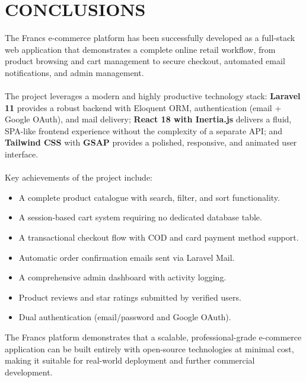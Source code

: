 \chapter{CONCLUSIONS}

The Francs e-commerce platform has been successfully developed as a full-stack web application that demonstrates a complete online retail workflow, from product browsing and cart management to secure checkout, automated email notifications, and admin management.
\\\\
The project leverages a modern and highly productive technology stack: \textbf{Laravel 11} provides a robust backend with Eloquent ORM, authentication (email + Google OAuth), and mail delivery; \textbf{React 18 with Inertia.js} delivers a fluid, SPA-like frontend experience without the complexity of a separate API; and \textbf{Tailwind CSS} with \textbf{GSAP} provides a polished, responsive, and animated user interface.
\\\\
Key achievements of the project include:
\begin{itemize}
    \item A complete product catalogue with search, filter, and sort functionality.
    \item A session-based cart system requiring no dedicated database table.
    \item A transactional checkout flow with COD and card payment method support.
    \item Automatic order confirmation emails sent via Laravel Mail.
    \item A comprehensive admin dashboard with activity logging.
    \item Product reviews and star ratings submitted by verified users.
    \item Dual authentication (email/password and Google OAuth).
\end{itemize}
The Francs platform demonstrates that a scalable, professional-grade e-commerce application can be built entirely with open-source technologies at minimal cost, making it suitable for real-world deployment and further commercial development.
